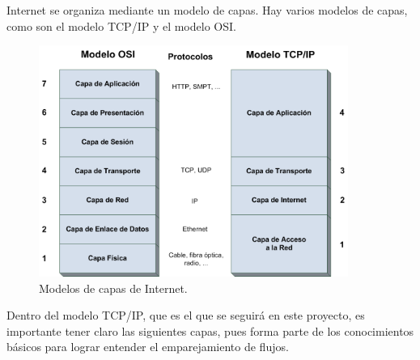 \intro Internet se organiza mediante un modelo de capas. Hay varios modelos de capas, como son el modelo TCP/IP y el modelo OSI. \cite{redes2010}

\begin{figure}[H]
  \includegraphics[width=0.9\textwidth]{imagenes/capas.png}
  \centering
  \caption{Modelos de capas de Internet.}
\end{figure}

\intro Dentro del modelo TCP/IP, que es el que se seguirá en este proyecto, es importante tener claro las siguientes 
capas, pues forma parte de los conocimientos básicos para lograr entender el emparejamiento de flujos.

